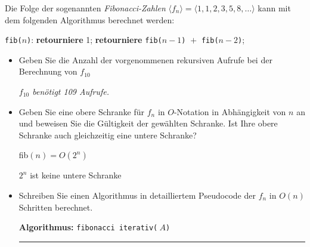 \documentclass[a4paper, 12pt]{article}
\begin{document}
\ueblatt
\setcounter{angabe}{0}




\begin{angabe}
Die Folge der sogenannten \emph{Fibonacci-Zahlen}
$\langle f_n\rangle = \langle 1, 1, 2, 3, 5, 8, \ldots\rangle$ kann mit
dem folgenden Algorithmus berechnet werden:
\begin{center}
\begin{minipage}{8cm}
\begin{algorithmic}
\item[\texttt{fib(}$n$\texttt):]
	\ZEILE \textbf{retourniere} 1;
\SONST
	\ZEILE \textbf{retourniere} \texttt{fib(}$n - 1$\texttt)
		${} + {}$
		\texttt{fib(}$n - 2$\texttt);
\ENDFALLS
\end{algorithmic}
\end{minipage}
\end{center}
\begin{itemize}
\item Geben Sie die Anzahl der vorgenommenen rekursiven Aufrufe bei der
	Berechnung von $f_{10}$ 

	\textit{$f_{10}$ benötigt 109 Aufrufe.}
	
\item Geben Sie eine obere Schranke für $f_n$ in $O$-Notation in
	Abhängigkeit von $n$ an und beweisen Sie die Gültigkeit der
	gewählten Schranke. Ist Ihre obere Schranke auch gleichzeitig
	eine untere Schranke?
	
fib$(n)=O(2^n)$ 

$2^n$ ist keine untere Schranke
	
\item Schreiben Sie einen Algorithmus in detailliertem Pseudocode der
	$f_n$ in $O(n)$ Schritten berechnet.\newline
	

\begin{minipage}{10cm}
\textbf{Algorithmus:} \texttt{fibonacci iterativ(}$~A$\texttt)
\hrule
{}
\end{minipage}
\end{itemize}
\end{angabe}
\end{document}
